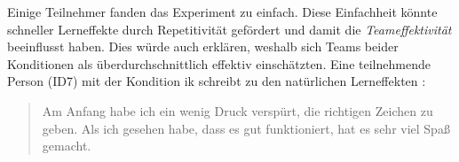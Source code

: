 \documentclass[a4paper,11pt]{article}%
\renewcommand{\\}{\vspace*{0.5\baselineskip} \newline}
\begin{document}
{{Einige Teilnehmer fanden das Experiment zu einfach. Diese Einfachheit könnte schneller Lerneffekte durch Repetitivität gefördert und damit die \textit{Teameffektivität} beeinflusst haben. Dies würde auch erklären, weshalb sich Teams beider Konditionen als überdurchschnittlich effektiv einschätzten.
Eine teilnehmende Person (ID7) mit der Kondition \ac{ik} schreibt zu den natürlichen Lerneffekten :
\begin{quote}
\glqq{}Am Anfang habe ich ein wenig Druck verspürt, die richtigen Zeichen zu geben. Als ich gesehen habe, dass es gut funktioniert, hat es sehr viel Spaß gemacht.\dq{}
\end{quote}
%
%


}}
\end{document}
